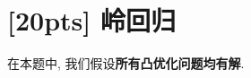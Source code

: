 \documentclass[a4paper]{article}
\numberwithin{equation}{section}
\theoremstyle{definition}
\def \x {\bm{x}}
\newcommand\sbr[1]{\left( #1 \right)}
\newcommand\indicator[1]{\mathbb{I}\sbr{#1}}
\begin{document}





\section{[20pts] 岭回归}

在本题中, 我们假设\textbf{所有凸优化问题均有解}.
\end{document}
